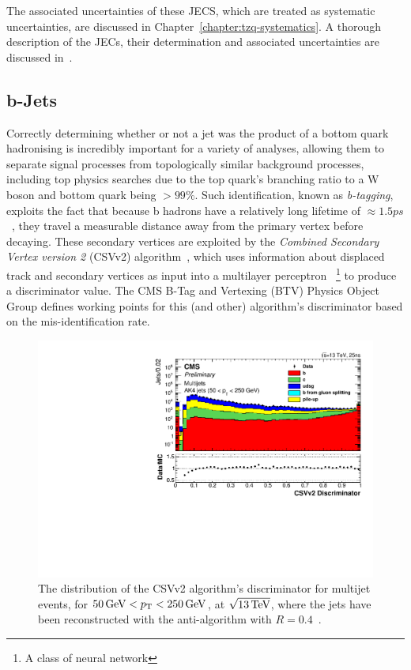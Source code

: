 The associated uncertainties of these JECS, which are treated as systematic uncertainties, are discussed in Chapter~\ref{chapter:tzq-systematics}.
A thorough description of the JECs, their determination and associated uncertainties are discussed in~\cite{Khachatryan:2016kdb}.

\subsection{b-Jets}
Correctly determining whether or not a jet was the product of a bottom quark hadronising is incredibly important for a variety of analyses, allowing them to separate signal processes from topologically similar background processes, including top physics searches due to the top quark's branching ratio to a W boson and bottom quark being $> 99\%$.
Such identification, known as \emph{b-tagging}, exploits the fact that because b hadrons have a relatively long lifetime of $\approx 1.5 ps$~\cite{Beringer:1900zz}, they travel a measurable distance away from the primary vertex before decaying. 
These secondary vertices are exploited by the \emph{Combined Secondary Vertex version 2} (CSVv2) algorithm~\cite{Chatrchyan:2012jua,CMS:206kkf}, which uses information about displaced track and secondary vertices as input into a multilayer perceptron ~\footnote{A class of neural network} to produce a discriminator value.
The CMS B-Tag and Vertexing (BTV) Physics Object Group defines working points for this (and other) algorithm's discriminator based on the mis-identification rate.

\begin{figure}[h]
\centering
\includegraphics{figs/data-mc/ak4_pfjets_CSVIVF_Log.pdf}
\caption{The distribution of the CSVv2 algorithm's discriminator for multijet events, for $50\,\text{Ge\hspace{-.08em}V} < p_{\mathrm{T}} < 250\,\text{Ge\hspace{-.08em}V}$, at $\sqrt{13\,\text{Te\hspace{-.08em}V}}$, where the jets have been reconstructed with the anti-\kt algorithm with $R = 0.4$~\cite{CMS:2016kkf}.}
\label{fig:bTagDiscriminator}
\end{figure}


